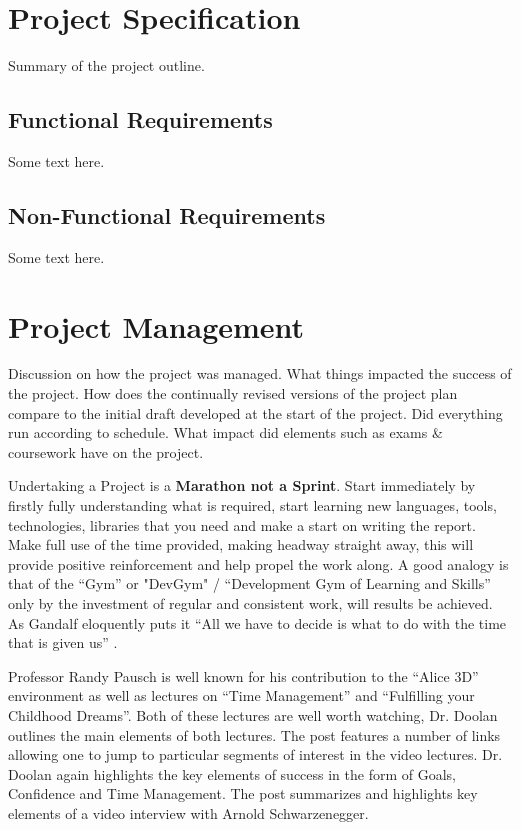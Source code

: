 \chapter{Project Specification}
Summary of the project outline.

\section{Functional Requirements}
Some text here.

\section{Non-Functional Requirements}
Some text here.

\chapter{Project Management}
Discussion on how the project was managed. What things impacted the success of the project. How does the continually revised versions of the project plan compare to the initial draft developed at the start of the project. Did everything run according to schedule. What impact did elements such as exams \& coursework have on the project. 

Undertaking a Project is a \textbf{Marathon not a Sprint}. Start immediately by firstly fully understanding what is required, start learning new languages, tools, technologies, libraries that you need and make a start on writing the report. Make full use of the time provided, making headway straight away, this will provide positive reinforcement and help propel the work along. A good analogy is that of the ``Gym'' or "DevGym" / ``Development Gym of Learning and Skills'' only by the investment of regular and consistent work, will results be achieved. As Gandalf eloquently puts it ``All we have to decide is what to do with the time that is given us'' \cite{book:Tolkien:1991:FOTR}\cite{online:Jackson:2001:FOTR}. 

Professor Randy Pausch is well known for his contribution to the ``Alice 3D'' environment as well as lectures on ``Time Management'' and ``Fulfilling your Childhood Dreams''. Both of these lectures are well worth watching, Dr. Doolan \cite{online:Doolan:2015:PauschLecture} outlines the main elements of both lectures. The post features a number of links allowing one to jump to particular segments of interest in the video lectures. Dr. Doolan \cite{online:Doolan:2016:SchwarzeneggerInterview} again highlights the key elements of success in the form of Goals, Confidence and Time Management. The post summarizes and highlights key elements of a video interview with Arnold Schwarzenegger.

